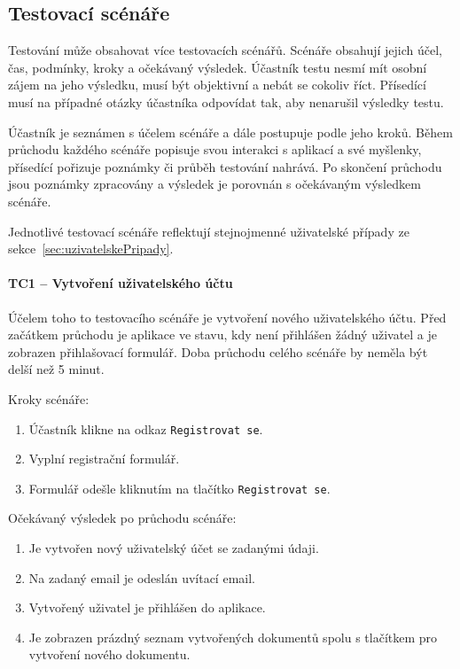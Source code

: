 
\subsection{Testovací scénáře}\label{subsec:testovacíScénáře}

Testování může obsahovat více testovacích scénářů.
Scénáře obsahují jejich účel, čas, podmínky, kroky a očekávaný výsledek.
Účastník testu nesmí mít osobní zájem na jeho výsledku, musí být objektivní a nebát se cokoliv říct.
Přísedící musí na případné otázky účastníka odpovídat tak, aby nenarušil výsledky testu.

Účastník je seznámen s účelem scénáře a dále postupuje podle jeho kroků.
Během průchodu každého scénáře popisuje svou interakci s aplikací a své myšlenky, přísedící pořizuje poznámky či průběh testování nahrává.
Po skončení průchodu jsou poznámky zpracovány a výsledek je porovnán s očekávaným výsledkem scénáře.

Jednotlivé testovací scénáře reflektují stejnojmenné uživatelské případy ze sekce~\ref{sec:uzivatelskePripady}.

\paragraph{TC1 -- Vytvoření uživatelského účtu}

Účelem toho to testovacího scénáře je vytvoření nového uživatelského účtu.
Před začátkem průchodu je aplikace ve stavu, kdy není přihlášen žádný uživatel a je zobrazen přihlašovací formulář.
Doba průchodu celého scénáře by neměla být delší než 5 minut.

Kroky scénáře:
\begin{enumerate}
    \item Účastník klikne na odkaz \texttt{Registrovat se}.
    \item Vyplní registrační formulář.
    \item Formulář odešle kliknutím na tlačítko \texttt{Registrovat se}.
\end{enumerate}

Očekávaný výsledek po průchodu scénáře:
\begin{enumerate}
    \item Je vytvořen nový uživatelský účet se zadanými údaji.
    \item Na zadaný email je odeslán uvítací email.
    \item Vytvořený uživatel je přihlášen do aplikace.
    \item Je zobrazen prázdný seznam vytvořených dokumentů spolu s tlačítkem pro vytvoření nového dokumentu.
\end{enumerate}

